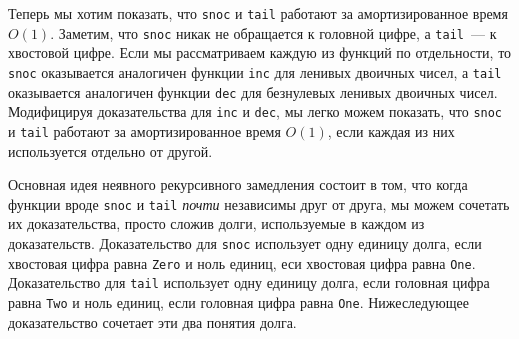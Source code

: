 Теперь мы хотим показать, что \lstinline!snoc! и \lstinline!tail!
работают за амортизированное время $O(1)$. Заметим, что
\lstinline!snoc! никак не обращается к головной цифре, а
\lstinline!tail!~--- к хвостовой цифре. Если мы рассматриваем каждую
из функций по отдельности, то \lstinline!snoc! оказывается аналогичен
функции \lstinline!inc! для ленивых двоичных чисел, а \lstinline!tail!
оказывается аналогичен функции \lstinline!dec! для безнулевых ленивых
двоичных чисел. Модифицируя доказательства для \lstinline!inc! и
\lstinline!dec!, мы легко можем показать, что \lstinline!snoc! и
\lstinline!tail! работают за амортизированное время $O(1)$, если
каждая из них используется отдельно от другой.

Основная идея неявного рекурсивного замедления состоит в том, что
когда функции вроде \lstinline!snoc! и \lstinline!tail! \emph{почти}
независимы друг от друга, мы можем сочетать их доказательства, просто
сложив долги, используемые в каждом из доказательств. Доказательство
для \lstinline!snoc! использует одну единицу долга, если хвостовая
цифра равна \lstinline!Zero! и ноль единиц, еси хвостовая цифра равна
\lstinline!One!. Доказательство для \lstinline!tail! использует одну
единицу долга, если головная цифра равна \lstinline!Two! и ноль
единиц, если головная цифра равна \lstinline!One!. Нижеследующее
доказательство сочетает эти два понятия долга.

